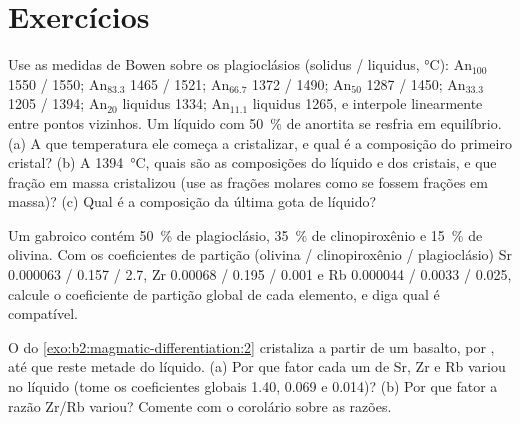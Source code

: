 \section{Exercícios}

\begin{exercise}[$\star$]\label{exo:b2:magmatic-differentiation:1}
Use as medidas de Bowen sobre os plagioclásios (solidus / liquidus, \unit{\celsius}):
An$_{100}$ 1550 / 1550; An$_{83.3}$ 1465 / 1521; An$_{66.7}$ 1372 / 1490; An$_{50}$
1287 / 1450; An$_{33.3}$ 1205 / 1394; An$_{20}$ liquidus 1334; An$_{11.1}$ liquidus
1265, e interpole linearmente entre pontos vizinhos. Um líquido com
\qty{50}{\percent} de anortita se resfria em equilíbrio. (a) A que temperatura ele
começa a cristalizar, e qual é a composição do primeiro cristal? (b) A
\qty{1394}{\celsius}, quais são as composições do líquido e dos cristais,
e que fração em massa cristalizou (use as frações molares como se fossem frações
em massa)? (c) Qual é a composição da última gota de líquido?
\end{exercise}

\begin{exercise}[$\star$]\label{exo:b2:magmatic-differentiation:2}
Um  gabroico contém \qty{50}{\percent} de plagioclásio, \qty{35}{\percent} de
clinopiroxênio e \qty{15}{\percent} de olivina. Com os coeficientes de partição
(olivina / clinopiroxênio / plagioclásio) Sr 0.000063 / 0.157 / 2.7, Zr 0.00068 /
0.195 / 0.001 e Rb 0.000044 / 0.0033 / 0.025, calcule o coeficiente de partição
global de cada elemento, e diga qual é compatível.
\end{exercise}

\begin{exercise}[$\star$]\label{exo:b2:magmatic-differentiation:3}
O  do \cref{exo:b2:magmatic-differentiation:2} cristaliza a partir de um basalto, por ,
até que reste metade do líquido. (a) Por que fator cada um de Sr, Zr e Rb variou
no líquido (tome os coeficientes globais 1.40, 0.069 e 0.014)? (b) Por que fator
a razão Zr/Rb variou? Comente com o corolário sobre as razões.
\end{exercise}

